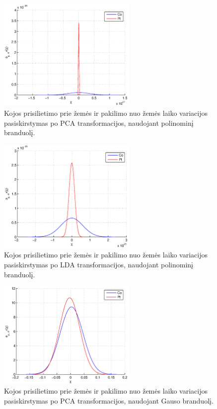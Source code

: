 \documentclass[]{vgtuef}
\begin{document}
\begin{figure}[!t]
  \centering
  \includegraphics[width=250px]{figures/st_sw_poly_kpca.eps}
  \caption{Kojos prisilietimo prie žemės ir pakilimo nuo žemės laiko
    variacijos pasiskirstymas po PCA transformacijos, naudojant
    polinominį branduolį.}
  \label{fig:poly_pca}
\end{figure}

\begin{figure}[!t]
  \centering
  \includegraphics[width=250px]{figures/st_sw_poly_gda.eps}
  \caption{Kojos prisilietimo prie žemės ir pakilimo nuo žemės laiko
    variacijos pasiskirstymas po LDA transformacijos, naudojant
    polinominį branduolį.}
  \label{fig:poly_lda}
\end{figure}

\begin{figure}[!t]
  \centering
  \includegraphics[width=250px]{figures/st_sw_gauss_kpca.eps}
  \caption{Kojos prisilietimo prie žemės ir pakilimo nuo žemės laiko
    variacijos pasiskirstymas po PCA transformacijos, naudojant Gauso branduolį.}
  \label{fig:gauss_pca}
\end{figure}
\end{document}

